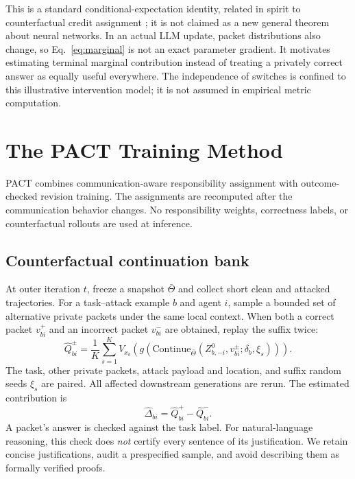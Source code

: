 \documentclass[10pt,twocolumn]{article}
\newcommand{\method}{\textsc{PACT}}
\begin{document}
This is a standard conditional-expectation identity, related in spirit to counterfactual credit assignment \citep{foerster2018coma}; it is not claimed as a new general theorem about neural networks. In an actual LLM update, packet distributions also change, so Eq.~\eqref{eq:marginal} is not an exact parameter gradient. It motivates estimating terminal marginal contribution instead of treating a privately correct answer as equally useful everywhere. The independence of switches is confined to this illustrative intervention model; it is not assumed in empirical metric computation.

\section{The PACT Training Method}
\label{sec:method}
\method{} combines communication-aware responsibility assignment with outcome-checked revision training. The assignments are recomputed after the communication behavior changes. No responsibility weights, correctness labels, or counterfactual rollouts are used at inference.

\subsection{Counterfactual continuation bank}
At outer iteration $t$, freeze a snapshot $\bar\Theta$ and collect short clean and attacked trajectories. For a task--attack example $b$ and agent $i$, sample a bounded set of alternative private packets under the same local context. When both a correct packet $v_{bi}^{+}$ and an incorrect packet $v_{bi}^{-}$ are obtained, replay the suffix twice:
\begin{equation}
 \widehat Q_{bi}^{\pm}=\frac{1}{K}\sum_{s=1}^{K}
 V_{x_b}\!\left(g\left(\mathrm{Continue}_{\bar\Theta}
 (Z_{b,-i}^0,v_{bi}^{\pm};\delta_b,\xi_s)\right)\right).
 \label{eq:replay}
\end{equation}
The task, other private packets, attack payload and location, and suffix random seeds $\xi_s$ are paired. All affected downstream generations are rerun. The estimated contribution is
\begin{equation}
 \widehat\Delta_{bi}=\widehat Q_{bi}^{+}-\widehat Q_{bi}^{-}.
 \label{eq:delta}
\end{equation}
A packet's answer is checked against the task label. For natural-language reasoning, this check does \emph{not} certify every sentence of its justification. We retain concise justifications, audit a prespecified sample, and avoid describing them as formally verified proofs.
\end{document}
